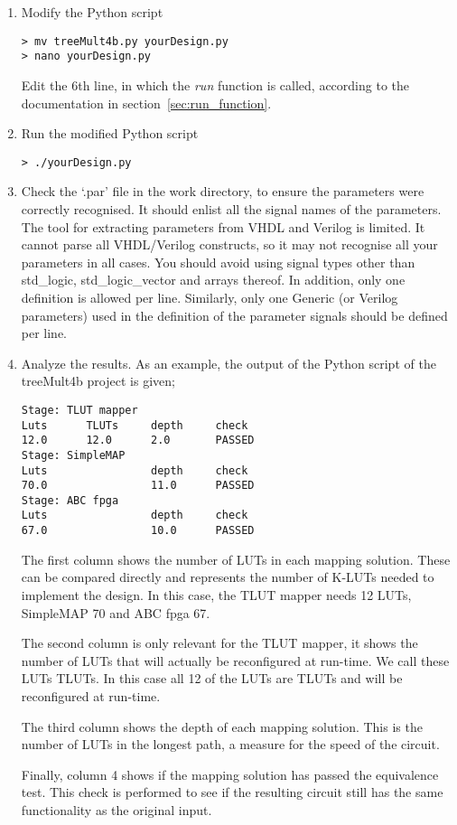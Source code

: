 \documentclass[a4paper,oneside]{memoir}
\begin{document}
\begin{enumerate}
\item Modify the Python script\\
\begin{lstlisting}
> mv treeMult4b.py yourDesign.py
> nano yourDesign.py
\end{lstlisting}
Edit the 6th line, in which the \emph{run} function is called, according to the documentation in section~\ref{sec:run_function}.
\item Run the modified Python script
\begin{lstlisting}
> ./yourDesign.py
\end{lstlisting}
\item \label{sec:check_par}Check the `.par' file in the work directory, to ensure the parameters were correctly recognised. It should enlist all the signal names of the parameters. \\
The tool for extracting parameters from VHDL and Verilog is limited. It cannot parse all VHDL/Verilog constructs, so it may not recognise all your parameters in all cases. You should avoid using signal types other than std\_logic, std\_logic\_vector and arrays thereof. In addition, only one definition is allowed per line. Similarly, only one Generic (or Verilog parameters) used in the definition of the parameter signals should be defined per line.

\item Analyze the results. As an example, the output of the Python script of the treeMult4b project is given;\\

\begin{lstlisting}
Stage: TLUT mapper
Luts      TLUTs     depth     check
12.0      12.0      2.0       PASSED    
Stage: SimpleMAP
Luts                depth     check     
70.0                11.0      PASSED    
Stage: ABC fpga
Luts                depth     check     
67.0                10.0      PASSED 
\end{lstlisting}

The first column shows the number of LUTs in each mapping solution. These can be compared directly and represents the number of K-LUTs needed to implement the design. In this case, the TLUT mapper needs 12 LUTs, SimpleMAP 70 and ABC fpga 67.

The second column is only relevant for the TLUT mapper, it shows the number of LUTs that will actually be reconfigured at run-time. We call these LUTs TLUTs. In this case all 12 of the LUTs are TLUTs and will be reconfigured at run-time.

The third column shows the depth of each mapping solution. This is the number of LUTs in the longest path, a measure for the speed of the circuit. 

Finally, column 4 shows if the mapping solution has passed the equivalence test. This check is performed to see if the resulting circuit still has the same functionality as the original input.


\end{enumerate}
\end{document}

